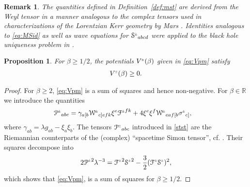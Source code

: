 \documentclass[a4paper,10pt,reqno]{amsart}
\newcommand{\Scal}{\mathop{\rm Scal}}
\theoremstyle{plain}
\newtheorem{prop}[thm]{Proposition}
\newtheorem{remark}[thm]{Remark}
\newcommand{\PM}[1]{{{#1}^{\hspace{-.5pt}\scaleto{\pm}{3.5pt}}}}
\def\Wcal{\mathcal{W}}
\def\Fcal{\mathcal{F}}
\def\Scal{\mathcal{S}}
\numberwithin{equation}{section}
\begin{document}
\begin{remark} 
The quantities defined in Definition~\ref{def:mst} are derived from the Weyl tensor in a manner analogous to the complex tensors used in characterizations of the Lorentzian Kerr geometry by 
%
Mars \cite{MR1701088}.
Identities analogous to \eqref{eq:MSid} as well as wave equations for $\PM{\Scal}_{abcd}$ were applied to the black hole uniqueness problem in 
%
\cite{MR2672799, MR2461426}. 
\end{remark} 

\begin{prop}\label{prop:V(beta)} 
For $\beta \geq 1/2$, the potentials $\PM{V}(\beta)$ given in \eqref{eq:Vpm} satisfy
\begin{align}
\PM{V}(\beta) \geq 0.
\end{align}
\end{prop}
\begin{proof}
For $\beta \geq 2$, \eqref{eq:Vpm} is a sum of squares and hence non-negative. For  $\beta \in \mathbb{R}$ we introduce the
quantities 
\begin{align}
\label{stst}
\PM{\mathcal{P}}_{abc} ={}&  \gamma_{a[b}\PM{\Wcal}_{c]efk} \xi^{e} \PM{\Fcal}^{fk}  + 4 \xi^{e} \xi^{f} \PM{\Wcal}_{eaf[b}  \PM{\sigma}_{c]},
\end{align}
where $ \gamma_{ab}= \lambda g_{ab} -  \xi_{a} \xi_{b}$. 
The tensors $\PM{\mathcal{P}}_{abc}$ introduced in \eqref{stst} are  the  Riemannian counterparts of the (complex)  ``spacetime Simon tensor'', cf. \cite[Definition 1]{MR1701088}. 
Their squares decompose into 
\begin{align}
2 \PM{\mathcal{P}}^2 \lambda^{-3} = \PM{\Fcal}^2 \PM{\Scal}^2 -\frac{3}{2} (\PM{\Fcal}\PM{\Scal})^2, 
\end{align}
which shows that \eqref{eq:Vpm}, is a sum of squares for $\beta \geq 1/2$.
\end{proof}
\end{document}
